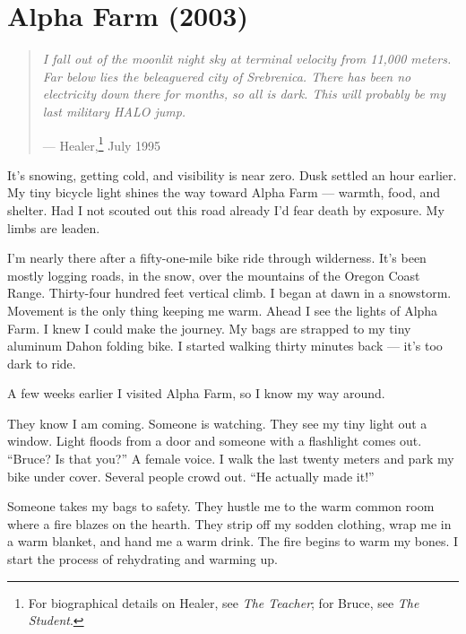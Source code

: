 

\chapter{Alpha Farm (2003)}
\label{record:alpha-farm}

\begin{quote}
\textit{I fall out of the moonlit night sky at terminal velocity from 11,000 meters. Far below lies the beleaguered city of Srebrenica. There has been no electricity down there for months, so all is dark. This will probably be my last military HALO jump.}

\hfill --- Healer,\footnote{For biographical details on Healer, see \textit{The Teacher}; for Bruce, see \textit{The Student}.} July 1995
\end{quote}

\vspace{0.5cm}

It's snowing, getting cold, and visibility is near zero. Dusk settled an hour earlier. My tiny bicycle light shines the way toward Alpha Farm --- warmth, food, and shelter. Had I not scouted out this road already I'd fear death by exposure. My limbs are leaden.

I'm nearly there after a fifty-one-mile bike ride through wilderness. It's been mostly logging roads, in the snow, over the mountains of the Oregon Coast Range. Thirty-four hundred feet vertical climb. I began at dawn in a snowstorm. Movement is the only thing keeping me warm. Ahead I see the lights of Alpha Farm. I knew I could make the journey. My bags are strapped to my tiny aluminum Dahon folding bike. I started walking thirty minutes back --- it's too dark to ride.

A few weeks earlier I visited Alpha Farm, so I know my way around.

They know I am coming. Someone is watching. They see my tiny light out a window. Light floods from a door and someone with a flashlight comes out. ``Bruce? Is that you?'' A female voice. I walk the last twenty meters and park my bike under cover. Several people crowd out. ``He actually made it!''

Someone takes my bags to safety. They hustle me to the warm common room where a fire blazes on the hearth. They strip off my sodden clothing, wrap me in a warm blanket, and hand me a warm drink. The fire begins to warm my bones. I start the process of rehydrating and warming up.

